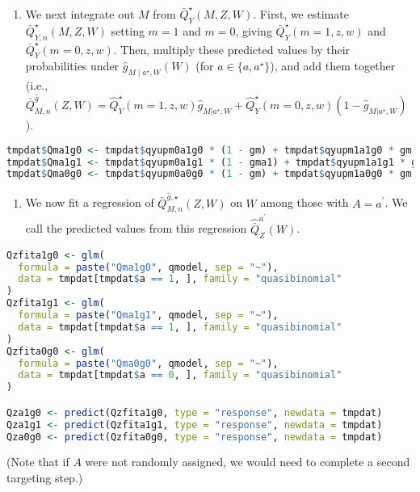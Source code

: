 \documentclass[
  12pt,
]{book}
\providecommand{\tightlist}{%
  \setlength{\itemsep}{0pt}\setlength{\parskip}{0pt}}
\theoremstyle{definition}
\theoremstyle{definition}
\theoremstyle{definition}
\newcommand{\1}{\mathbbm{1}}
\begin{document}
\begin{enumerate}
\def\labelenumi{\arabic{enumi}.}
\setcounter{enumi}{7}
\tightlist
\item
  We next integrate out \(M\) from \(\bar{Q}^{\star}_{Y}(M,Z,W)\). First, we
  estimate \(\bar{Q}^{\star}_{Y,n}(M,Z,W)\) setting \(m=1\) and \(m=0\), giving
  \(\bar{Q}^{\star}_Y(m=1, z, w)\) and \(\bar{Q}^{\star}_Y(m=0, z, w)\). Then,
  multiply these predicted values by their probabilities under
  \(\hat{g}_{M \mid a^{\star},W}(W)\) (for \(a \in \{a, a^{\star}\}\)), and add
  them together (i.e., \(\bar{Q}^{\hat{g}}_{M,n}(Z,W) = \hat{Q}^{\star}_Y(m=1, z, w) \hat{g}_{M|a^{\star},W} + \hat{Q}^{\star}_Y(m=0, z, w)(1-\hat{g}_{M|a^{\star},W})\)).
\end{enumerate}

\begin{lstlisting}[language=R]
tmpdat$Qma1g0 <- tmpdat$qyupm0a1g0 * (1 - gm) + tmpdat$qyupm1a1g0 * gm
tmpdat$Qma1g1 <- tmpdat$qyupm0a1g1 * (1 - gma1) + tmpdat$qyupm1a1g1 * gma1
tmpdat$Qma0g0 <- tmpdat$qyupm0a0g0 * (1 - gm) + tmpdat$qyupm1a0g0 * gm
\end{lstlisting}

\begin{enumerate}
\def\labelenumi{\arabic{enumi}.}
\setcounter{enumi}{8}
\tightlist
\item
  We now fit a regression of \(\bar{Q}^{\hat{g},\star}_{M,n}(Z,W)\) on \(W\)
  among those with \(A=a^\prime\). We call the predicted values from this
  regression \(\hat{\bar{Q}}^{a^\prime}_{Z}(W)\).
\end{enumerate}

\begin{lstlisting}[language=R]
Qzfita1g0 <- glm(
  formula = paste("Qma1g0", qmodel, sep = "~"),
  data = tmpdat[tmpdat$a == 1, ], family = "quasibinomial"
)
Qzfita1g1 <- glm(
  formula = paste("Qma1g1", qmodel, sep = "~"),
  data = tmpdat[tmpdat$a == 1, ], family = "quasibinomial"
)
Qzfita0g0 <- glm(
  formula = paste("Qma0g0", qmodel, sep = "~"),
  data = tmpdat[tmpdat$a == 0, ], family = "quasibinomial"
)

Qza1g0 <- predict(Qzfita1g0, type = "response", newdata = tmpdat)
Qza1g1 <- predict(Qzfita1g1, type = "response", newdata = tmpdat)
Qza0g0 <- predict(Qzfita0g0, type = "response", newdata = tmpdat)
\end{lstlisting}

(Note that if \(A\) were not randomly assigned, we would need to complete a
second targeting step.)
\end{document}
